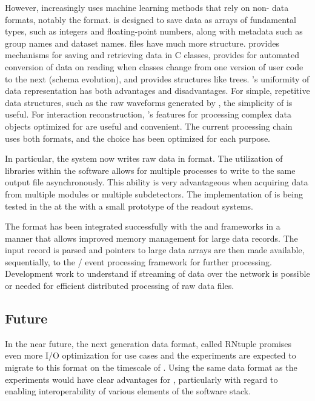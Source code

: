 \documentclass[../main-v1.tex]{subfiles}
\begin{document}
However,  increasingly uses   machine learning methods that rely on non- data formats, notably the  format.   is designed to save data as arrays of fundamental types, such as integers and floating-point numbers, along with metadata such as group names and dataset names.   files have much more structure.   provides mechanisms for saving and retrieving data in C\raisebox{1pt}{++} classes, provides for automated conversion of data on reading when classes change from one version of user code to the next (schema evolution), and provides structures like trees. 's uniformity of data representation has both advantages and disadvantages. For simple, repetitive data structures, such as the raw waveforms generated by , the simplicity of  is useful.  For interaction reconstruction, 's features for processing complex data objects optimized for  are useful and convenient.  The current  processing chain uses both formats, and the choice has been optimized for each purpose.

In particular, the   system now writes raw data in  format. The utilization of  libraries within the  software allows for multiple processes to write to the same output file asynchronously. This ability is very advantageous when acquiring data from multiple  modules or multiple  subdetectors. The implementation of  is being tested %
in the  \coldbox at the  with a small prototype of the %
  readout systems. 

The  format has been integrated successfully with the  and  frameworks in a manner that allows improved memory management for large data records.  The  input  record is parsed and pointers to large data arrays are then made available, sequentially, to the / event processing framework for further processing. Development work to understand if streaming of  data over the network is possible or needed for efficient distributed processing of raw data files.

\subsection{Future }
In the near future, the next generation  data format, called RNtuple  promises even more I/O optimization for  use cases and the  experiments are expected to migrate to this format on the timescale of .  Using the same data format as the  experiments would have clear advantages for , particularly with regard to enabling interoperability of various elements of the software stack.
\end{document}
